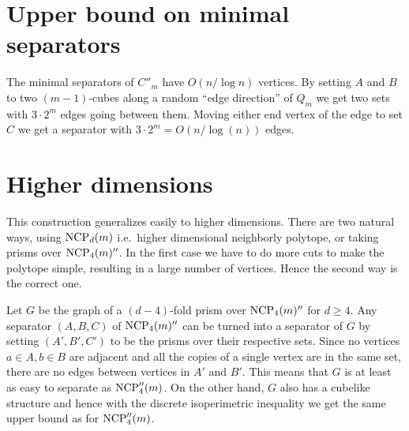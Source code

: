 \section{Upper bound on minimal separators}

The minimal separators of $C''_m$ have $O(n/\log n)$ vertices. By setting $A$ 
and $B$ to two $(m-1)$-cubes along a random ``edge direction'' of $Q_m$ we get 
two sets with $3\cdot 2^m$ edges going between them. Moving either end vertex 
of the edge to set $C$ we get a separator with $3\cdot 2^m = O(n/\log(n))$ 
edges.

\section{Higher dimensions}

This construction generalizes easily to higher dimensions. There are two 
natural ways, using $\textrm{NCP}_d(m)$ i.e.\ higher dimensional neighborly polytope, or 
taking prisms over $\textrm{NCP}_4(m)''$.  In the first case we have to do more cuts to 
make the polytope simple, resulting in a large number of vertices. Hence the 
second way is the correct one. 

Let $G$ be the graph of a $(d-4)$-fold prism over $\textrm{NCP}_4(m)''$ for $d\geq 4$. 
Any separator 
$(A,B,C)$ of $\textrm{NCP}_4(m)''$ can be turned into a separator of $G$ by setting 
$(A',B',C')$ to be the prisms over their respective sets. Since no vertices 
$a\in A, b\in B$ are adjacent and all the copies of a single vertex are in the 
same set, there are no edges between vertices in $A'$ and $B'$. This means that 
$G$ is at least as easy to separate as $\textrm{NCP}''_4(m)$. On the other hand, $G$ 
also has a cubelike structure and hence with the discrete isoperimetric 
inequality we get the same upper bound as for $\textrm{NCP}''_4(m)$. 




